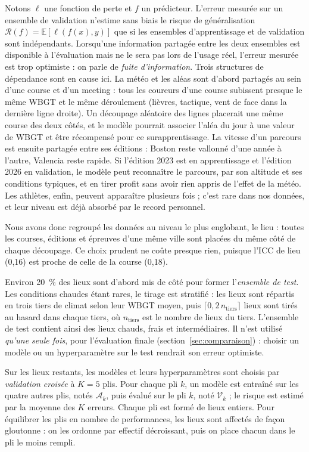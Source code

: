 \documentclass[11pt,a4paper]{article}
\newcommand{\E}{\mathbb{E}}
\begin{document}
Notons $\ell$ une fonction de perte et $f$ un prédicteur. L'erreur mesurée sur un ensemble de validation n'estime sans
biais le risque de généralisation $\mathcal{R}(f) = \E[\ell(f(x), y)]$ que si les ensembles d'apprentissage et de
validation sont indépendants. Lorsqu'une information partagée entre les deux ensembles est disponible à l'évaluation
mais ne le sera pas lors de l'usage réel, l'erreur mesurée est trop optimiste : on parle de \emph{fuite
d'information}. Trois structures de dépendance sont en cause ici. La météo et les aléas sont d'abord partagés au sein
d'une course et d'un meeting : tous les coureurs d'une course subissent presque le même WBGT et le même déroulement
(lièvres, tactique, vent de face dans la dernière ligne droite). Un découpage aléatoire des lignes placerait une même
course des deux côtés, et le modèle pourrait associer l'aléa du jour à une valeur de WBGT et être récompensé pour ce
surapprentissage. La vitesse d'un parcours est ensuite partagée entre ses éditions : Boston reste vallonné d'une année
à l'autre, Valencia reste rapide. Si l'édition 2023 est en apprentissage et l'édition 2026 en validation, le modèle peut
reconnaître le parcours, par son altitude et ses conditions typiques, et en tirer profit sans avoir rien appris de
l'effet de la météo. Les athlètes, enfin, peuvent apparaître plusieurs fois ; c'est rare dans nos données, et leur
niveau est déjà absorbé par le record personnel.

Nous avons donc regroupé les données au niveau le plus englobant, le lieu : toutes les courses, éditions et épreuves
d'une même ville sont placées du même côté de chaque découpage. Ce choix prudent ne coûte presque rien, puisque l'ICC
de lieu (0,16) est proche de celle de la course (0,18).

Environ 20~\% des lieux sont d'abord mis de côté pour former l'\emph{ensemble de test}. Les conditions chaudes étant
rares, le tirage est stratifié : les lieux sont répartis en trois tiers de climat selon leur WBGT moyen, puis
$\lceil 0{,}2\, n_{\text{tiers}} \rceil$ lieux sont tirés au hasard dans chaque tiers, où $n_{\text{tiers}}$ est le
nombre de lieux du tiers. L'ensemble de test contient ainsi des lieux chauds, frais et intermédiaires. Il n'est
utilisé \emph{qu'une seule fois}, pour l'évaluation finale (section~\ref{sec:comparaison}) : choisir un modèle ou un
hyperparamètre sur le test rendrait son erreur optimiste.

Sur les lieux restants, les modèles et leurs hyperparamètres sont choisis par \emph{validation croisée} à $K = 5$
plis. Pour chaque pli $k$, un modèle est entraîné sur les quatre autres plis, notés $\mathcal{A}_k$, puis évalué sur
le pli $k$, noté $\mathcal{V}_k$ ; le risque est estimé par la moyenne des $K$ erreurs. Chaque pli est formé de lieux
entiers. Pour équilibrer les plis en nombre de performances, les lieux sont affectés de façon gloutonne : on les
ordonne par effectif décroissant, puis on place chacun dans le pli le moins rempli.
\end{document}
